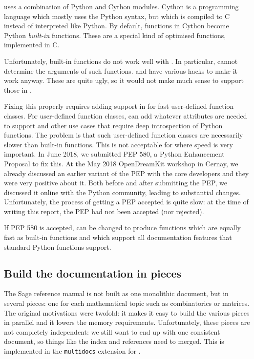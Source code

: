 \documentclass{deliverablereport}
\begin{document}
\Sage uses a combination of Python and Cython modules.
Cython is a programming language which mostly uses the Python syntax,
but which is compiled to C instead of interpreted like Python.
By default, functions in Cython become Python \emph{built-in} functions.
These are a special kind of optimised functions, implemented in C.

Unfortunately, built-in functions do not work well with \Sphinx.
In particular, \Sphinx cannot determine the arguments of such functions.
\Sage and \Cython have various hacks to make it work anyway.
These are quite ugly, so it would not make much sense to support those in \Sphinx.

Fixing this properly requires adding support in \Python
for fast user-defined function classes.
For user-defined function classes, \Cython can add whatever attributes
are needed to support \Sphinx and other use cases that require deep introspection
of Python functions.
The problem is that such user-defined function classes
are necessarily slower than built-in functions.
This is not acceptable for \Sage where speed is very important.
In June 2018, we submitted PEP 580, a Python Enhancement Proposal to fix this.
At the May 2018 OpenDreamKit workshop in Cernay,
we already discussed an earlier variant of the PEP
with the core \Cython developers and they were very positive about it.
Both before and after submitting the PEP,
we discussed it online with the Python community,
leading to substantial changes.
Unfortunately, the process of getting a PEP accepted is quite slow:
at the time of writing this report, the PEP had not been accepted (nor rejected).

If PEP 580 is accepted, \Cython can be changed to produce
functions which are equally fast as built-in functions
and which support all documentation
features that standard Python functions support.

\subsection{Build the documentation in pieces}\label{pieces}

The Sage reference manual is not built as one monolithic document,
but in several pieces:
one for each mathematical topic such as combinatorics or matrices.
The original motivations were twofold: it makes it easy to build the various pieces
in parallel and it lowers the memory requirements.
Unfortunately, these pieces are not completely independent:
we still want to end up with one consistent document,
so things like the index and references need to merged.
This is implemented in the \Sage \texttt{multidocs} extension for \Sphinx.
\end{document}
